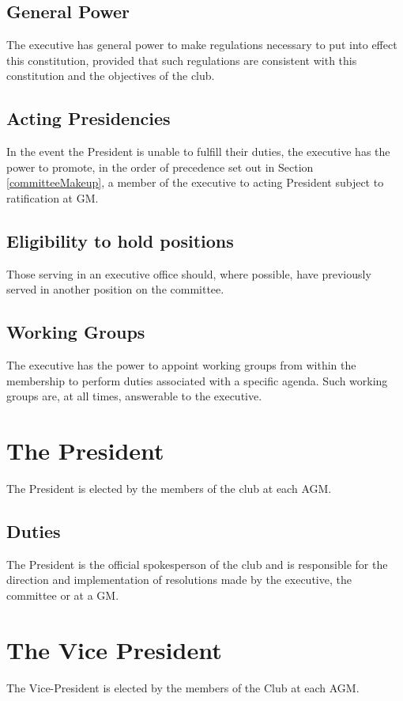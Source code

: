 \documentclass[11pt]{article}
\begin{document}
\subsection{General Power}
The executive has general power to make regulations necessary to put into effect this constitution, provided that such regulations are consistent with this constitution and the objectives of the club.

\subsection{Acting Presidencies}
In the event the President is unable to fulfill their duties, the executive has the power to promote, in the order of precedence set out in Section \ref{committeeMakeup}, a member of the executive to acting President subject to ratification at GM.

\subsection{Eligibility to hold positions}
Those serving in an executive office should, where possible, have previously served in another position on the committee.

\subsection{Working Groups}
The executive has the power to appoint working groups from within the membership to perform duties associated with a specific agenda. Such working groups are, at all times, answerable to the executive.

\section{The President}
The President is elected by the members of the club at each AGM.
\subsection{Duties}
The President is the official spokesperson of the club and is responsible for the direction and implementation of resolutions made by the executive, the committee or at a GM.

\section{The Vice President}
The Vice-President is elected by the members of the Club at each AGM.
\end{document}
